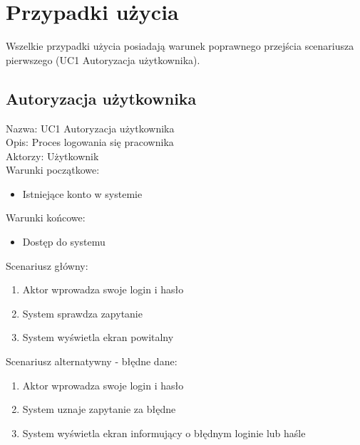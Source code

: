 \section{Przypadki użycia}

Wszelkie przypadki użycia posiadają warunek poprawnego przejścia scenariusza pierwszego (UC1 Autoryzacja użytkownika).

\subsection{Autoryzacja użytkownika} 
\begin{adjustwidth}{2em}{0pt}
Nazwa: UC1 Autoryzacja użytkownika \\
Opis: Proces logowania się pracownika \\
Aktorzy: Użytkownik \\
Warunki początkowe: 
\begin{itemize}
\item Istniejące konto w systemie 
\end{itemize}
Warunki końcowe: 
\begin{itemize}
\item Dostęp do systemu 
\end{itemize}
Scenariusz główny:
\begin{enumerate}
\item Aktor wprowadza swoje login i hasło
\item System sprawdza zapytanie
\item System wyświetla ekran powitalny
\end{enumerate}
Scenariusz alternatywny - błędne dane: 
\begin{enumerate}
\item Aktor wprowadza swoje login i hasło
\item System uznaje zapytanie za błędne
\item System wyświetla ekran informujący o błędnym loginie lub haśle 
\end{enumerate}
\end{adjustwidth}

